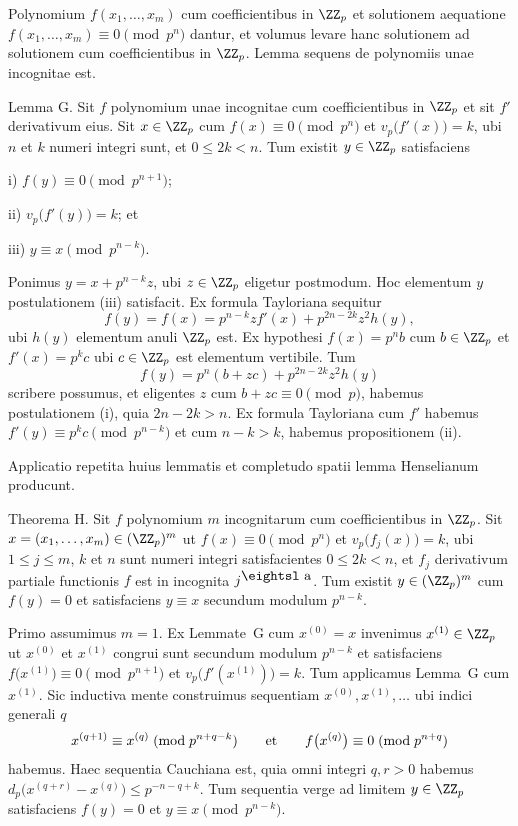 Polynomium $f(x_1, \ldots, x_m)$ cum coefficientibus in $\ZZ_p$ et solutionem aequatione
$f(x_1, \ldots, x_m) \equiv 0\pmod{p^n}$ dantur, et volumus levare hanc solutionem ad solutionem
cum coefficientibus in $\ZZ_p$. Lemma sequens de polynomiis unae incognitae est.

\proclaim Lemma G. Sit $f$ polynomium unae incognitae cum coefficientibus in $\ZZ_p$ et sit $f'$
derivativum eius. Sit $x\in \ZZ_p$ cum $f(x)\equiv 0\pmod{p^n}$ et $v_p\bigl(f'(x)\bigr)=k$, ubi
$n$ et $k$ numeri integri sunt, et $0\le 2k<n$. Tum existit $y\in \ZZ_p$ satisfaciens
\medskip
\item{i)} $f(y)\equiv 0\pmod{p^{n+1}}$;
\smallskip
\item{ii)} $v_p\bigl(f'(y)\bigr) = k$; et
\smallskip
\item{iii)} $y\equiv x\pmod{p^{n-k}}$.
\medskip

\enspace
Ponimus $y=x+p^{n-k}z$, ubi $z\in \ZZ_p$ eligetur postmodum. Hoc elementum $y$ postulationem
(iii) satisfacit. Ex formula Tayloriana sequitur
$$f(y) = f(x) = p^{n-k}z f'(x) + p^{2n-2k}z^2 h(y),$$
ubi $h(y)$ elementum anuli $\ZZ_p$ est. Ex hypothesi $f(x) = p^nb$ cum $b\in \ZZ_p$ et $f'(x) = p^k c$ ubi
$c\in \ZZ_p$ est elementum vertibile. Tum
$$f(y) = p^n(b+zc) + p^{2n-2k}z^2 h(y)$$
scribere possumus,
et eligentes $z$ cum $b+zc\equiv 0\pmod p$, habemus postulationem (i), quia $2n-2k>n$.
Ex formula Tayloriana cum $f'$ habemus $f'(y)\equiv p^kc\pmod{p^{n-k}}$ et cum $n-k>k$,
habemus propositionem (ii).\slug

Applicatio repetita huius lemmatis et completudo spatii lemma Henselianum producunt.

\proclaim Theorema H. Sit $f$ polynomium $m$ incognitarum cum coefficientibus in $\ZZ_p$. Sit
$x = (x_1, \ldots, x_m)\in (\ZZ_p)^m$ ut
$f(x)\equiv 0\pmod{p^n}$ et $v_p\bigl(f_j(x)\bigr) = k$,
ubi $1\le j\le m$, $k$ et $n$ sunt numeri integri satisfacientes
$0\le 2k< n$, et $f_j$ derivativum partiale
functionis $f$ est in incognita $j^{\hbox{\eightsl a}}$.
Tum existit $y\in (\ZZ_p)^m$ cum $f(y) = 0$ et satisfaciens $y\equiv x$ secundum modulum $p^{n-k}$.

\enspace
Primo assumimus $m=1$. Ex Lemmate~G cum $x^{(0)} = x$ invenimus $x^{(1)}\in \ZZ_p$ ut
$x^{(0)}$ et $x^{(1)}$ congrui sunt secundum modulum $p^{n-k}$ et
satisfaciens $f\bigl(x^{(1)}\bigr)\equiv 0\pmod{p^{n+1}}$ et $v_p\bigl(f'(x^{(1)})\bigr)=k$.
Tum applicamus Lemma~G cum $x^{(1)}$. Sic inductiva mente construimus sequentiam $x^{(0)},x^{(1)},\ldots$
ubi indici generali $q$
$$x^{(q+1)}\equiv x^{(q)}\pmod{p^{n+q-k}}\qquad\hbox{et}\qquad f\bigl(x^{(q)}\bigr)\equiv 0\pmod{p^{n+q}}$$
habemus.
Haec sequentia Cauchiana est, quia omni integri $q,r>0$ habemus
$d_p\bigl(x^{(q+r)} - x^{(q)}\bigr) \le p^{-n-q+k}$.
Tum sequentia verge ad limitem $y\in \ZZ_p$ satisfaciens $f(y) = 0$ et $y\equiv x\pmod{p^{n-k}}$.

